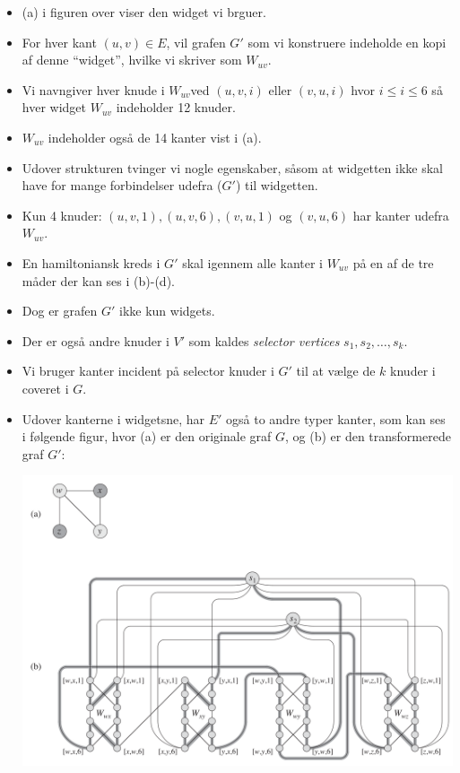 \begin{frame}[allowframebreaks]
\begin{itemize}
		\item (a) i figuren over viser den widget vi brguer.
		\item For hver kant $(u,v) \in E$, vil grafen $G'$ som vi konstruere indeholde en kopi af denne ``widget'', hvilke vi skriver som $W_{uv}$.
		\item Vi navngiver hver knude i $W_{uv}$ved $(u,v,i)$ eller $(v,u,i)$ hvor $i \le i \le 6$ så hver widget $W_{uv}$ indeholder 12 knuder.
		\item $W_{uv}$ indeholder også de 14 kanter vist i (a).
		\item Udover strukturen tvinger vi nogle egenskaber, såsom at widgetten ikke skal have for mange forbindelser udefra ($G'$) til widgetten.
		\item Kun 4 knuder: $(u,v,1), (u,v,6), (v,u,1)$ og $(v,u,6)$ har kanter              udefra $W_{uv}$.
		\item En hamiltoniansk kreds i $G'$ skal igennem alle kanter i $W_{uv}$ på en af de tre måder der kan ses i (b)-(d).
		\item Dog er grafen $G'$ ikke kun widgets.
		\item Der er også andre knuder i $V'$ som kaldes \textit{selector vertices} $s_{1}, s_{2}, \ldots, s_{k}$.
		\item Vi bruger kanter incident på selector knuder i $G'$ til at vælge de $k$ knuder i coveret i $G$.
		\item Udover kanterne i widgetsne, har $E'$ også to andre typer kanter, som kan ses i følgende figur, hvor (a) er den originale graf $G$, og (b) er den transformerede graf $G'$:
		      \begin{center}
			      \includegraphics[scale=0.25]{figur/figur3417.png}

\end{center}
\end{itemize}
\end{frame}
